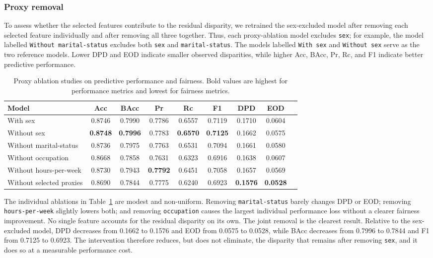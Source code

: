 \documentclass{article}
\begin{document}
\subsubsection{Proxy removal}
To assess whether the selected features contribute to the residual disparity,
we retrained the sex-excluded model after removing each selected feature
individually and after removing all three together. Thus, each proxy-ablation
model excludes \texttt{sex}; for example, the model labelled
\texttt{Without marital-status} excludes both \texttt{sex} and
\texttt{marital-status}. The models labelled \texttt{With sex} and
\texttt{Without sex} serve as the two reference models. Lower DPD and EOD
indicate smaller observed disparities, while higher Acc, BAcc, Pr, Rc, and F1
indicate better predictive performance.

\begin{table}[t]
  \centering
  \footnotesize
  \caption{Proxy ablation studies on predictive performance and fairness.
  Bold values are highest for performance metrics and lowest for fairness
  metrics.}
  \label{tab:proxy-ablation}
  \begin{tabular}{lcccccccc}
    \toprule
    Model & Acc & BAcc & Pr & Rc & F1 & DPD & EOD \\
    \midrule
    With sex & 0.8746 & 0.7990 & 0.7786 & 0.6557 & 0.7119 & 0.1710 & 0.0604 \\
    Without sex & \textbf{0.8748} & \textbf{0.7996} & 0.7783 & \textbf{0.6570} & \textbf{0.7125} & 0.1662 & 0.0575 \\
    Without marital-status & 0.8736 & 0.7975 & 0.7763 & 0.6531 & 0.7094 & 0.1661 & 0.0580 \\
    Without occupation & 0.8668 & 0.7858 & 0.7631 & 0.6323 & 0.6916 & 0.1638 & 0.0607 \\
    Without hours-per-week & 0.8730 & 0.7943 & \textbf{0.7792} & 0.6451 & 0.7058 & 0.1657 & 0.0569 \\
    Without selected proxies & 0.8690 & 0.7844 & 0.7775 & 0.6240 & 0.6923 & \textbf{0.1576} & \textbf{0.0528} \\
    \bottomrule
  \end{tabular}
\end{table}

The individual ablations in Table~\ref{tab:proxy-ablation} are modest and
non-uniform. Removing \texttt{marital-status} barely changes DPD or EOD;
removing \texttt{hours-per-week} slightly lowers both; and removing
\texttt{occupation} causes the largest individual performance loss without a
clearer fairness improvement. No single feature accounts for the residual
disparity on its own.
The joint removal is the clearest result. Relative to the sex-excluded model,
DPD decreases from 0.1662 to 0.1576 and EOD from 0.0575 to 0.0528, while BAcc
decreases from 0.7996 to 0.7844 and F1 from 0.7125 to 0.6923. The intervention
therefore reduces, but does not eliminate, the disparity that remains after
removing \texttt{sex}, and it does so at a measurable performance cost.
\end{document}
